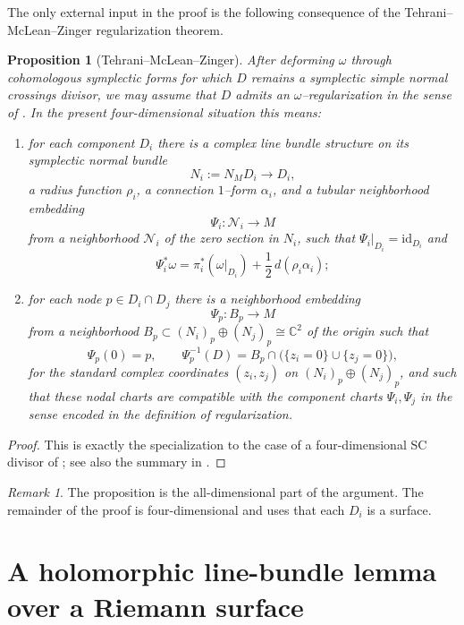 \documentclass[11pt]{article}
\newtheorem{proposition}[theorem]{Proposition}
\theoremstyle{remark}
\newtheorem{remark}[theorem]{Remark}
\newcommand{\CC}{\mathbb{C}}
\begin{document}
The only external input in the proof is the following consequence of the
Tehrani--McLean--Zinger regularization theorem.

\begin{proposition}[Tehrani--McLean--Zinger]\label{prop:TMZ}
After deforming $\omega$ through cohomologous symplectic forms for which $D$
remains a symplectic simple normal crossings divisor, we may assume that $D$
admits an $\omega$--regularization in the sense of
\cite[Definition~2.12]{TMZ}.
In the present four-dimensional situation this means:

\begin{enumerate}[label=\textup{(\roman*)}]
\item
for each component $D_i$ there is a complex line bundle structure on
its symplectic normal bundle
\[
N_i:=N_M D_i \to D_i,
\]
a radius function $\rho_i$, a connection $1$--form $\alpha_i$,
and a tubular neighborhood embedding
\[
\Psi_i\colon \mathcal N_i \to M
\]
from a neighborhood $\mathcal N_i$ of the zero section in $N_i$, such that
$\Psi_i|_{D_i}=\mathrm{id}_{D_i}$ and
\[
\Psi_i^*\omega
=
\pi_i^*(\omega|_{D_i})+\frac12\, d(\rho_i\alpha_i);
\]

\item
for each node $p\in D_i\cap D_j$ there is a neighborhood embedding
\[
\Psi_p\colon B_p\to M
\]
from a neighborhood $B_p\subset (N_i)_p\oplus (N_j)_p\cong\CC^2$ of the origin
such that
\[
\Psi_p(0)=p,\qquad
\Psi_p^{-1}(D)=B_p\cap\bigl(\{z_i=0\}\cup\{z_j=0\}\bigr),
\]
for the standard complex coordinates $(z_i,z_j)$ on $(N_i)_p\oplus (N_j)_p$,
and such that these nodal charts are compatible with the component charts
$\Psi_i,\Psi_j$ in the sense encoded in the definition of regularization.
\end{enumerate}
\end{proposition}

\begin{proof}
This is exactly the specialization to the case of a four-dimensional SC divisor
of \cite[Theorem~2.13]{TMZ}; see also the summary in \cite[\S3]{TMZCRAS}.
\end{proof}

\begin{remark}
The proposition is the all-dimensional part of the argument.  The remainder of the proof
is four-dimensional and uses that each $D_i$ is a surface.
\end{remark}

\section{A holomorphic line-bundle lemma over a Riemann surface}
\end{document}
